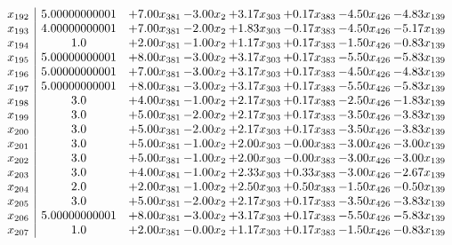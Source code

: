 \documentclass[8pt]{article}
\begin{document}
\[\begin{array}{c| c c@{\hskip 2pt} c@{\hskip 2pt} c@{\hskip 2pt} c@{\hskip 2pt} c@{\hskip 2pt} c@{\hskip 2pt} }
 x_{192}   &  5.00000000001 & +  7.00 x_{381} & -3.00 x_{2} & +  3.17 x_{303} & +  0.17 x_{383} & -4.50 x_{426} & -4.83 x_{139}\\
 x_{193}   &  4.00000000001 & +  7.00 x_{381} & -2.00 x_{2} & +  1.83 x_{303} & -0.17 x_{383} & -4.50 x_{426} & -5.17 x_{139}\\
 x_{194}   &  1.0 & +  2.00 x_{381} & -1.00 x_{2} & +  1.17 x_{303} & +  0.17 x_{383} & -1.50 x_{426} & -0.83 x_{139}\\
 x_{195}   &  5.00000000001 & +  8.00 x_{381} & -3.00 x_{2} & +  3.17 x_{303} & +  0.17 x_{383} & -5.50 x_{426} & -5.83 x_{139}\\
 x_{196}   &  5.00000000001 & +  7.00 x_{381} & -3.00 x_{2} & +  3.17 x_{303} & +  0.17 x_{383} & -4.50 x_{426} & -4.83 x_{139}\\
 x_{197}   &  5.00000000001 & +  8.00 x_{381} & -3.00 x_{2} & +  3.17 x_{303} & +  0.17 x_{383} & -5.50 x_{426} & -5.83 x_{139}\\
 x_{198}   &  3.0 & +  4.00 x_{381} & -1.00 x_{2} & +  2.17 x_{303} & +  0.17 x_{383} & -2.50 x_{426} & -1.83 x_{139}\\
 x_{199}   &  3.0 & +  5.00 x_{381} & -2.00 x_{2} & +  2.17 x_{303} & +  0.17 x_{383} & -3.50 x_{426} & -3.83 x_{139}\\
 x_{200}   &  3.0 & +  5.00 x_{381} & -2.00 x_{2} & +  2.17 x_{303} & +  0.17 x_{383} & -3.50 x_{426} & -3.83 x_{139}\\
 x_{201}   &  3.0 & +  5.00 x_{381} & -1.00 x_{2} & +  2.00 x_{303} & -0.00 x_{383} & -3.00 x_{426} & -3.00 x_{139}\\
 x_{202}   &  3.0 & +  5.00 x_{381} & -1.00 x_{2} & +  2.00 x_{303} & -0.00 x_{383} & -3.00 x_{426} & -3.00 x_{139}\\
 x_{203}   &  3.0 & +  4.00 x_{381} & -1.00 x_{2} & +  2.33 x_{303} & +  0.33 x_{383} & -3.00 x_{426} & -2.67 x_{139}\\
 x_{204}   &  2.0 & +  2.00 x_{381} & -1.00 x_{2} & +  2.50 x_{303} & +  0.50 x_{383} & -1.50 x_{426} & -0.50 x_{139}\\
 x_{205}   &  3.0 & +  5.00 x_{381} & -2.00 x_{2} & +  2.17 x_{303} & +  0.17 x_{383} & -3.50 x_{426} & -3.83 x_{139}\\
 x_{206}   &  5.00000000001 & +  8.00 x_{381} & -3.00 x_{2} & +  3.17 x_{303} & +  0.17 x_{383} & -5.50 x_{426} & -5.83 x_{139}\\
 x_{207}   &  1.0 & +  2.00 x_{381} & -0.00 x_{2} & +  1.17 x_{303} & +  0.17 x_{383} & -1.50 x_{426} & -0.83 x_{139}\\

\end{array}\]
\end{document}

